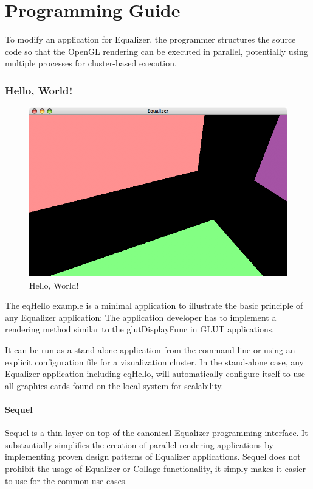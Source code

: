 \documentclass[10pt,a4]{scrartcl}
\begin{document}
\clearpage
\part{Programming Guide}

To modify an application for Equalizer, the programmer structures the
source code so that the OpenGL rendering can be executed in parallel,
potentially using multiple processes for cluster-based execution.

\section{\label{sHello}Hello, World!}

\begin{figure}
  \includegraphics[width=.618\textwidth]{images/eqHello.png}
  {\caption{\label{fHello}Hello, World!}}
\end{figure}
The \textsf{eqHello} example is a minimal application to illustrate the basic
principle of any Equalizer application: The application developer has to
implement a rendering method similar to the \textsf{glutDisplayFunc} in GLUT
applications.

It can be run as a stand-alone application from the command line or using an
explicit configuration file for a visualization cluster. In the stand-alone
case, any Equalizer application including eqHello, will automatically
configure itself to use all graphics cards found on the local system for
scalability.

\subsection{Sequel}

Sequel is a thin layer on top of the canonical Equalizer programming
interface. It substantially simplifies the creation of parallel rendering
applications by implementing proven design patterns of Equalizer
applications. Sequel does not prohibit the usage of Equalizer or Collage
functionality, it simply makes it easier to use for the common use cases.
\end{document}
